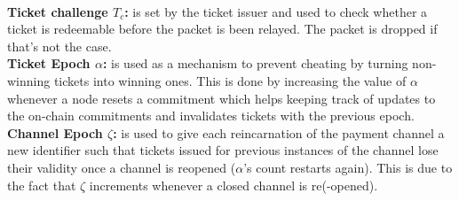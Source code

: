     \\\textbf{Ticket challenge $T_c$:}  is set by the ticket issuer and used to check whether a ticket is redeemable before the packet is been relayed. The packet is dropped if that's not the case.
    \\\textbf{Ticket Epoch $\alpha$:} is used as a mechanism to prevent cheating by turning non-winning tickets into winning ones. This is done by increasing the value of $\alpha$ whenever a node resets a commitment which helps keeping track of updates to the on-chain commitments and invalidates tickets with the previous epoch.
    \\\textbf{Channel Epoch $\zeta$:} is used to give each reincarnation of the payment channel a new identifier such that tickets issued for previous instances of the channel lose their validity once a channel is reopened ($\alpha$'s count restarts again). This is due to the fact that $\zeta$ increments whenever a closed channel is re(-opened).
    \begin{comment}
        
   
    \\\textbf{ChainId $c_{Id}$:} The channel identifier which is defined by the ticket issuer in order to determine which channel will be used between issuer and recipient. For example, tickets that are valid on xDAI are not valid on Ethereum.
    \\\textbf{Tag $\tau$} is given as a constant and depends on the utilized blockchain. It is used to distinguish HOPR tickets from others with the same structure that are meant for different payment channels and invalidates their usage in HOPR.
    \\\textbf{Version $V$} is given as a constant and depends on the utilized blockchain. It is used to invalidate tickets that were issued for previous versions of HOPR from being used in future iterations of the protocol.

\end{comment}

